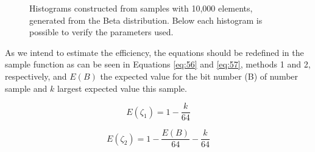 \documentclass[10pt]{article}
\begin{document}
\begin{figure}[ht]
{  }
  \caption{Histograms constructed from samples with 10,000 elements, generated from the Beta distribution. Below each histogram is possible to verify the parameters used.}
  \label{fig:02}
\end{figure}

As we intend to estimate the efficiency, the equations should be redefined in the sample function as can be seen in Equations \ref{eq:56} and \ref{eq:57}, methods 1 and 2, respectively, and $E(B)$ the expected value for the bit number (B) of number sample and $k$ largest expected value this sample.
 
\begin{equation}\label{eq:56}
 E(\zeta_1) = 1 - \frac{k}{64}
\end{equation}

\begin{equation}\label{eq:57}
 E(\zeta_2) = 1 - \frac{E(B)}{64} - \frac{k}{64}
\end{equation}
 
\end{document}
